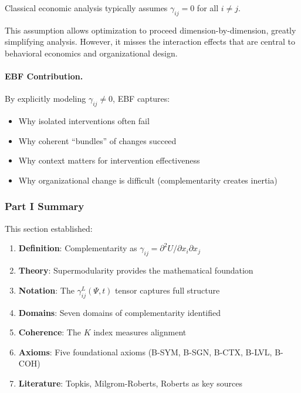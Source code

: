 \begin{proposition}
\label{prop:classical-independence}
Classical economic analysis typically assumes $\gamma_{ij} = 0$ for all $i \neq j$.
\end{proposition}

This assumption allows optimization to proceed dimension-by-dimension, 
greatly simplifying analysis. However, it misses the interaction effects 
that are central to behavioral economics and organizational design.

\paragraph{EBF Contribution.}
By explicitly modeling $\gamma_{ij} \neq 0$, EBF captures:
\begin{itemize}
    \item Why isolated interventions often fail
    \item Why coherent ``bundles'' of changes succeed
    \item Why context matters for intervention effectiveness
    \item Why organizational change is difficult (complementarity creates inertia)
\end{itemize}

\subsubsection{Part I Summary}

This section established:

\begin{enumerate}
    \item \textbf{Definition}: Complementarity as $\gamma_{ij} = \partial^2 U / \partial x_i \partial x_j$
    \item \textbf{Theory}: Supermodularity provides the mathematical foundation
    \item \textbf{Notation}: The $\gamma^L_{ij}(\Psi, t)$ tensor captures full structure
    \item \textbf{Domains}: Seven domains of complementarity identified
    \item \textbf{Coherence}: The $K$ index measures alignment
    \item \textbf{Axioms}: Five foundational axioms (B-SYM, B-SGN, B-CTX, B-LVL, B-COH)
    \item \textbf{Literature}: Topkis, Milgrom-Roberts, Roberts as key sources
\end{enumerate}

